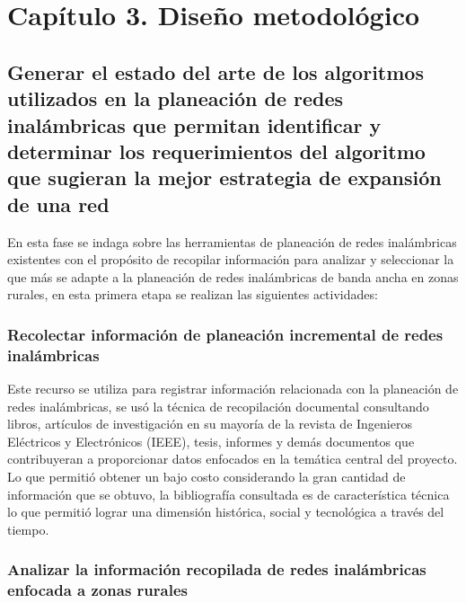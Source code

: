 \documentclass[]{article}
\begin{document}
\section{Capítulo 3. Diseño
metodológico}\label{capuxedtulo-3.-diseuxf1o-metodoluxf3gico}

\subsection{Generar el estado del arte de los algoritmos utilizados en
la planeación de redes inalámbricas que permitan identificar y
determinar los requerimientos del algoritmo que sugieran la mejor
estrategia de expansión de una
red}\label{generar-el-estado-del-arte-de-los-algoritmos-utilizados-en-la-planeaciuxf3n-de-redes-inaluxe1mbricas-que-permitan-identificar-y-determinar-los-requerimientos-del-algoritmo-que-sugieran-la-mejor-estrategia-de-expansiuxf3n-de-una-red}

En esta fase se indaga sobre las herramientas de planeación de redes
inalámbricas existentes con el propósito de recopilar información para
analizar y seleccionar la que más se adapte a la planeación de redes
inalámbricas de banda ancha en zonas rurales, en esta primera etapa se
realizan las siguientes actividades:

\subsubsection{\texorpdfstring{\textbf{Recolectar información de
planeación incremental de redes
inalámbricas}}{Recolectar información de planeación incremental de redes inalámbricas}}\label{recolectar-informaciuxf3n-de-planeaciuxf3n-incremental-de-redes-inaluxe1mbricas}

Este recurso se utiliza para registrar información relacionada con la
planeación de redes inalámbricas, se usó la técnica de recopilación
documental consultando libros, artículos de investigación en su mayoría
de la revista de Ingenieros Eléctricos y Electrónicos (IEEE), tesis,
informes y demás documentos que contribuyeran a proporcionar datos
enfocados en la temática central del proyecto. Lo que permitió obtener
un bajo costo considerando la gran cantidad de información que se
obtuvo, la bibliografía consultada es de característica técnica lo que
permitió lograr una dimensión histórica, social y tecnológica a través
del tiempo.

\subsubsection{\texorpdfstring{\textbf{Analizar la información
recopilada de redes inalámbricas enfocada a zonas
rurales}}{Analizar la información recopilada de redes inalámbricas enfocada a zonas rurales}}\label{analizar-la-informaciuxf3n-recopilada-de-redes-inaluxe1mbricas-enfocada-a-zonas-rurales}
\end{document}
